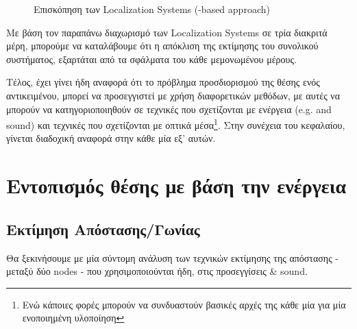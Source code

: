 \begin{figure} [H]
{
	}
	\decoRule
	\caption[Επισκόπηση των Localization Systems (RF-based approach)]{Επισκόπηση των Localization Systems (-based approach)}
	\label{fig:Localization-system}
\end{figure}

Με βάση τον παραπάνω διαχωρισμό των Localization Systems σε τρία διακριτά μέρη, μπορούμε να καταλάβουμε
ότι η απόκλιση της εκτίμησης του συνολικού συστήματος, εξαρτάται από τα σφάλματα  του κάθε μεμονωμένου μέρους.

Τέλος, έχει γίνει ήδη αναφορά ότι το πρόβλημα προσδιορισμού της θέσης ενός α\-ντι\-κει\-μέ\-νου, μπορεί να προσεγγιστεί με χρήση διαφορετικών μεθόδων,
με αυτές να μπορούν να κατηγοριοποιηθούν σε τεχνικές που σχετίζονται με ενέργεια (e.g.  and sound)
και τεχνικές που σχετίζονται με οπτικά μέσα\footnote{Ενώ κάποιες φορές μπορούν να συνδυαστούν βασικές αρχές της κάθε μία για μία ενοποιημένη υλοποίηση}. Στην συνέχεια του κεφαλαίου, γίνεται διαδοχική αναφορά στην κάθε μία εξ' αυτών.  

\section{Εντοπισμός θέσης με βάση την ενέργεια} \label{sec:Energy-based} 

\subsection{Εκτίμηση Απόστασης/Γωνίας}\label{sec:Distance-Angle-Estimation}

Θα ξεκινήσουμε με μία σύντομη ανάλυση των τεχνικών εκτίμησης της απόστασης - μεταξύ δύο nodes -
που χρησιμοποιούνται ήδη, στις προσεγγίσεις  \& sound. 

